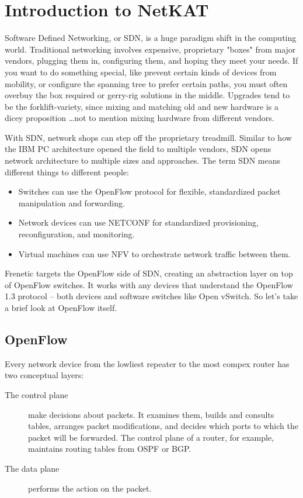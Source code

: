 \chapter{Introduction to NetKAT}

Software Defined Networking, or SDN, is a huge paradigm shift in the computing world.  
Traditional networking involves 
expensive, proprietary "boxes" from major vendors, plugging them in, configuring them, and hoping they 
meet your needs.  
If you want to do something special, like prevent certain kinds of devices from mobility, or configure 
the spanning tree to prefer certain paths, you must often overbuy the box required or gerry-rig solutions in the middle.
Upgrades tend to be the forklift-variety, since mixing and matching old and new hardware is a dicey proposition
\ldots not to mention mixing hardware from different vendors.

With SDN, network shops can step off the proprietary treadmill.  
Similar to how the IBM PC architecture opened the field to multiple vendors, SDN opens network architecture 
to multiple sizes and approaches.
The term SDN means different things to different people:

\begin{itemize}
\item Switches can use the OpenFlow protocol for flexible, standardized packet manipulation and forwarding.  
\item Network devices can use NETCONF for standardized provisioning, reconfiguration, and monitoring.
\item Virtual machines can use NFV  to orchestrate network traffic between them.
\end{itemize}

Frenetic targets the OpenFlow side of SDN, creating an abstraction layer on top of OpenFlow switches. 
It works with any devices that understand the OpenFlow 1.3 protocol -- 
both devices and software switches like Open vSwitch.  
So let's take a brief look at OpenFlow itself.

\section{OpenFlow}

Every network device from the lowliest repeater to the most compex router has two conceptual layers:

\begin{description}
\item[The control plane] make decisions about packets.
It examines them, builds and consults tables, arranges packet modifications, and decides which ports to
which the packet will be forwarded.
The control plane of a router, for example, maintains routing tables from OSPF or BGP.
\item[The data plane] performs the action on the packet. 
\end{description}

